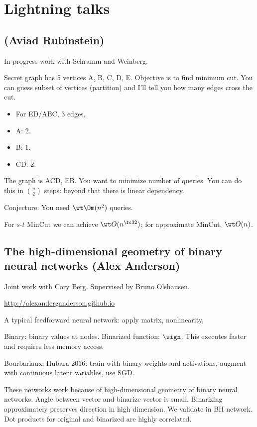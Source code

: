\section{Lightning talks}

\subsection{(Aviad Rubinstein)}

In progress work with Schramm and Weinberg.

Secret graph has 5 vertices A, B, C, D, E. Objective is to find minimum cut. You can guess subset of vertices (partition) and I'll tell you how many edges cross the cut. 
\begin{itemize}
\item
For ED/ABC, 3 edges.
\item
A: 2.
\item
B: 1.
\item
CD: 2.
\end{itemize}
The graph is ACD, EB. 
You want to minimize number of queries. You can do this in $\binom n2$ steps: beyond that there is linear dependency.

Conjecture: You need $\wt \Om(n^2)$ queries. 

\begin{thm}
For $s$-$t$ MinCut we can achieve $\wt O(n^{\fc 32})$; for approximate MinCut, $\wt O(n)$.
\end{thm}

\subsection{The high-dimensional geometry of binary neural networks (Alex Anderson)}

Joint work with Cory Berg. Supervised by Bruno Olshausen.

\url{http://alexanderganderson.github.io}

A typical feedforward neural network: apply matrix, nonlinearity, 

Binary: binary values at nodes. Binarized function: $\sign$. This executes faster and requires less memory access.

Bourbariaux, Hubara 2016: train with binary weights and activations, augment with continuous latent variables, use SGD.

These networks work because of high-dimensional geometry of binary neural networks. Angle between vector and binarize vector is small. Binarizing approximately preserves direction in high dimension.
We validate in BH network. Dot products for original and binarized are highly correlated.

